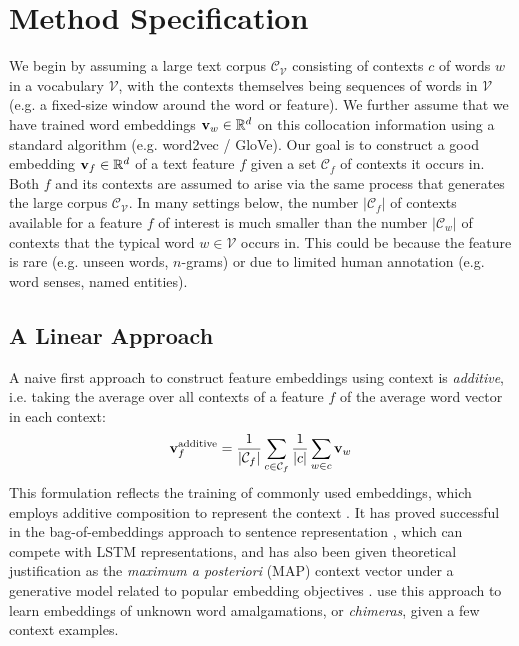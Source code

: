 \documentclass[11pt,a4paper]{article}
\begin{document}
\section{Method Specification}\label{sec:specification}

We begin by assuming a large text corpus $\mathcal{C}_\mathcal{V}$ consisting of contexts $c$ of words $w$ in a vocabulary $\mathcal{V}$, with the contexts themselves being sequences of words in $\mathcal{V}$ (e.g. a fixed-size window around the word or feature).
We further assume that we have trained word embeddings ${\bf v}_w\in\mathbb{R}^d$ on this collocation information using a standard algorithm (e.g. word2vec / GloVe).
Our goal is to construct a good embedding ${\bf v}_f\in\mathbb{R}^d$ of a text feature $f$ given a set $\mathcal{C}_f$ of contexts it occurs in.
Both $f$ and its contexts are assumed to arise via the same process that generates the large corpus $\mathcal{C}_\mathcal{V}$.
In many settings below, the number $|\mathcal{C}_f|$ of contexts available for a feature $f$ of interest is much smaller than the number $|\mathcal{C}_w|$ of contexts that the typical word $w\in\mathcal{V}$ occurs in.
This could be because the feature is rare (e.g. unseen words, $n$-grams) or due to limited human annotation (e.g. word senses, named entities).

\subsection{A Linear Approach}\label{subsec:approach}

A naive first approach to construct feature embeddings using context is {\em additive}, i.e. taking the average over all contexts of a feature $f$ of the average word vector in each context:
\begin{equation}\label{eq:additive}
{\bf v}_f^\textrm{additive}=\frac{1}{|\mathcal{C}_f|}\sum\limits_{c\in\mathcal{C}_f}\frac{1}{|c|}\sum\limits_{w\in c}{\bf v}_w
\end{equation}
This formulation reflects the training of commonly used embeddings, which employs additive composition to represent the context \cite{Mikolov:13,Pennington:14}. 
It has proved successful in the bag-of-embeddings approach to sentence representation \cite{Wieting:16,Arora:17}, which can compete with LSTM representations, and has also been given theoretical justification as the {\em maximum a posteriori} (MAP) context vector under a generative model related to popular embedding objectives \cite{Arora:16}.
\citet{Lazaridou:17} use this approach to learn embeddings of unknown word amalgamations, or {\em chimeras}, given a few context examples.
\end{document}
